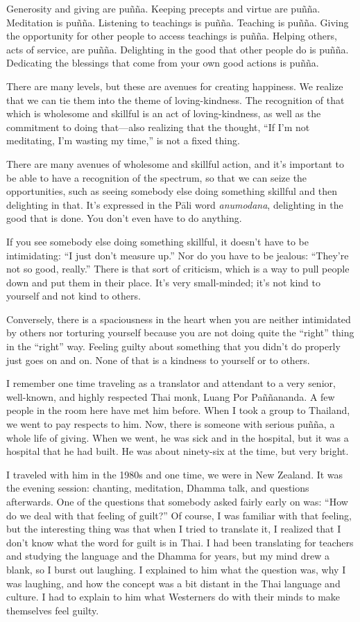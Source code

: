 Generosity and giving are puñña. Keeping precepts and virtue are puñña.
Meditation is puñña. Listening to teachings is puñña. Teaching is puñña.
Giving the opportunity for other people to access teachings is puñña.
Helping others, acts of service, are puñña. Delighting in the good that
other people do is puñña. Dedicating the blessings that come from your
own good actions is puñña.

There are many levels, but these are avenues for creating happiness. We
realize that we can tie them into the theme of loving-kindness. The
recognition of that which is wholesome and skillful is an act of
loving-kindness, as well as the commitment to doing that—also realizing
that the thought, “If I’m not meditating, I’m wasting my time,” is not a
fixed thing.

There are many avenues of wholesome and skillful action, and it’s
important to be able to have a recognition of the spectrum, so that we
can seize the opportunities, such as seeing somebody else doing
something skillful and then delighting in that. It’s expressed in the
Pāli word \emph{anumodana}, delighting in the good that is done. You
don’t even have to do anything.

If you see somebody else doing something skillful, it doesn’t have to be
intimidating: “I just don’t measure up.” Nor do you have to be jealous:
“They’re not so good, really.” There is that sort of criticism, which is
a way to pull people down and put them in their place. It’s very
small-minded; it’s not kind to yourself and not kind to others.

Conversely, there is a spaciousness in the heart when you are neither
intimidated by others nor torturing yourself because you are not doing
quite the “right” thing in the “right” way. Feeling guilty about
something that you didn’t do properly just goes on and on. None of that
is a kindness to yourself or to others.

I remember one time traveling as a translator and attendant to a very
senior, well-known, and highly respected Thai monk, Luang Por
Paññananda. A few people in the room here have met him before. When I
took a group to Thailand, we went to pay respects to him. Now, there is
someone with serious puñña, a whole life of giving. When we went, he was
sick and in the hospital, but it was a hospital that he had built. He
was about ninety-six at the time, but very bright.

I traveled with him in the 1980s and one time, we were in New Zealand.
It was the evening session: chanting, meditation, Dhamma talk, and
questions afterwards. One of the questions that somebody asked fairly
early on was: “How do we deal with that feeling of guilt?” Of course, I
was familiar with that feeling, but the interesting thing was that when
I tried to translate it, I realized that I don’t know what the word for
guilt is in Thai. I had been translating for teachers and studying the
language and the Dhamma for years, but my mind drew a blank, so I burst
out laughing. I explained to him what the question was, why I was
laughing, and how the concept was a bit distant in the Thai language and
culture. I had to explain to him what Westerners do with their minds to
make themselves feel guilty.


